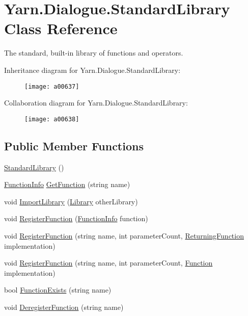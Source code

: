 \hypertarget{a00166}{\section{Yarn.\-Dialogue.\-Standard\-Library Class Reference}
\label{a00166}
}


The standard, built-\/in library of functions and operators.  




Inheritance diagram for Yarn.\-Dialogue.\-Standard\-Library\-:
\nopagebreak
\begin{figure}[H]
\begin{center}
\leavevmode
\texttt{[image: a00637]}
\end{center}
\end{figure}


Collaboration diagram for Yarn.\-Dialogue.\-Standard\-Library\-:
\nopagebreak
\begin{figure}[H]
\begin{center}
\leavevmode
\texttt{[image: a00638]}
\end{center}
\end{figure}
\subsection*{Public Member Functions}
\begin{DoxyCompactItemize}
\item 
\hyperlink{a00166_a1bf2ea2b59a842bafffec78667a86b19}{Standard\-Library} ()
\item 
\hyperlink{a00108}{Function\-Info} \hyperlink{a00131_aacfb1f00ad8aa3921941b8d8af0960e0}{Get\-Function} (string name)
\item 
void \hyperlink{a00131_ab42a4fd30a72156cafa685f959deef78}{Import\-Library} (\hyperlink{a00131}{Library} other\-Library)
\item 
void \hyperlink{a00131_a001ab29d21fe7db10fc9c250914287f9}{Register\-Function} (\hyperlink{a00108}{Function\-Info} function)
\item 
void \hyperlink{a00131_a2a698de0b528b2bac17bd85f57d45d4b}{Register\-Function} (string name, int parameter\-Count, \hyperlink{a00053_a5177bf74fbfe7303fac9d8236c2e514b}{Returning\-Function} implementation)
\item 
void \hyperlink{a00131_a6820eaa082077f16496effbc9041b7ad}{Register\-Function} (string name, int parameter\-Count, \hyperlink{a00053_ae0be2e5cf13d5779816102439e61ff1a}{Function} implementation)
\item 
bool \hyperlink{a00131_a6c9a1cc3e25b6aae25e210d8a0d68c09}{Function\-Exists} (string name)
\item 
void \hyperlink{a00131_a47d1b3664733207d5cda15f4a4a7af7a}{Deregister\-Function} (string name)
\end{DoxyCompactItemize}


